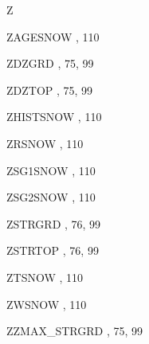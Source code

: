 \begin{theindex}
  \indexspace
Z
  \item ZAGESNOW
    \subitem {},  110
  \item ZDZGRD
    \subitem {},  75, 99
  \item ZDZTOP
    \subitem {},  75, 99
  \item ZHISTSNOW
    \subitem {},  110
  \item ZRSNOW
    \subitem {},  110
  \item ZSG1SNOW
    \subitem {},  110
  \item ZSG2SNOW
    \subitem {},  110
  \item ZSTRGRD
    \subitem {},  76, 99
  \item ZSTRTOP
    \subitem {},  76, 99
  \item ZTSNOW
    \subitem {},  110
  \item ZWSNOW
    \subitem {},  110
  \item ZZMAX\_STRGRD
    \subitem {},  75, 99

\end{theindex}
